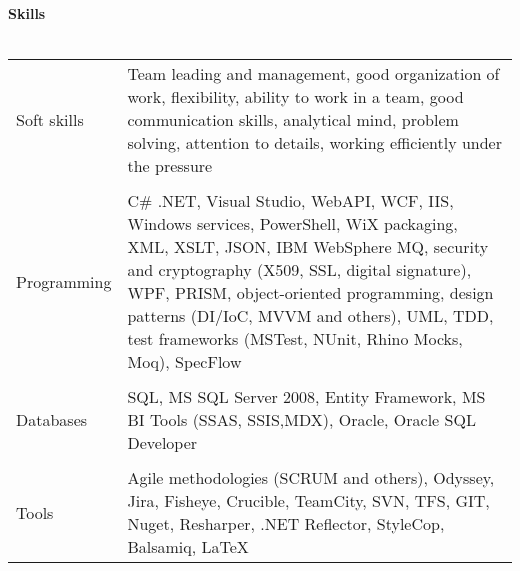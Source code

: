 \textbf{Skills}
\\
\\
\begin{tabular}{p{}|p{}}
Soft skills&
Team leading and management, good organization of work, flexibility, ability to work in a team, good communication skills, analytical mind, problem solving, attention to details, working efficiently under the pressure \\
&\\
Programming&
C\# .NET, Visual Studio, WebAPI, WCF, IIS, Windows services, PowerShell, WiX packaging, XML, XSLT, JSON, IBM WebSphere MQ, security and cryptography (X509, SSL, digital signature), WPF, PRISM, object-oriented programming, design patterns (DI/IoC, MVVM and others), UML, TDD, test frameworks (MSTest, NUnit, Rhino Mocks, Moq), SpecFlow\\
&\\
Databases&
SQL, MS SQL Server 2008, Entity Framework, MS BI Tools (SSAS, SSIS,MDX), Oracle, Oracle SQL Developer\\
&\\
Tools&
Agile methodologies (SCRUM and others), Odyssey, Jira, Fisheye, Crucible, TeamCity, SVN, TFS, GIT, Nuget, Resharper, .NET Reflector, StyleCop, Balsamiq, \LaTeX
\end{tabular}